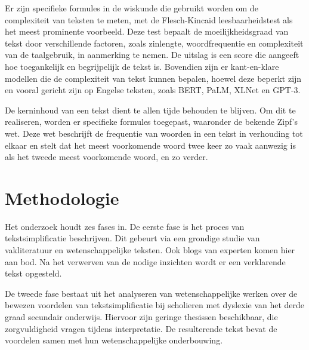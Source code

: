 

Er zijn specifieke formules in de wiskunde die gebruikt worden om de complexiteit van teksten te meten, met de Flesch-Kincaid leesbaarheidstest als het meest prominente voorbeeld. Deze test bepaalt de moeilijkheidsgraad van tekst door verschillende factoren, zoals zinlengte, woordfrequentie en complexiteit van de taalgebruik, in aanmerking te nemen. De uitslag is een score die aangeeft hoe toegankelijk en begrijpelijk de tekst is. Bovendien zijn er kant-en-klare modellen die de complexiteit van tekst kunnen bepalen, hoewel deze beperkt zijn en vooral gericht zijn op Engelse teksten, zoals BERT, PaLM, XLNet en GPT-3.

De kerninhoud van een tekst dient te allen tijde behouden te blijven. Om dit te realiseren, worden er specifieke formules toegepast, waaronder de bekende Zipf's wet. Deze wet beschrijft de frequentie van woorden in een tekst in verhouding tot elkaar en stelt dat het meest voorkomende woord twee keer zo vaak aanwezig is als het tweede meest voorkomende woord, en zo verder.





\section{Methodologie}%
\label{sec:methodologie}

Het onderzoek houdt zes fases in. De eerste fase is het proces van tekstsimplificatie beschrijven. Dit gebeurt via een grondige studie van vakliteratuur en wetenschappelijke teksten. Ook blogs van experten komen hier aan bod. Na het verwerven van de nodige inzichten wordt er een verklarende tekst opgesteld.

De tweede fase bestaat uit het analyseren van wetenschappelijke werken over de bewezen voordelen van tekstsimplificatie bij scholieren met dyslexie van het derde graad secundair onderwijs. Hiervoor zijn geringe thesissen beschikbaar, die zorgvuldigheid vragen tijdens interpretatie. De resulterende tekst bevat de voordelen samen met hun wetenschappelijke onderbouwing.

